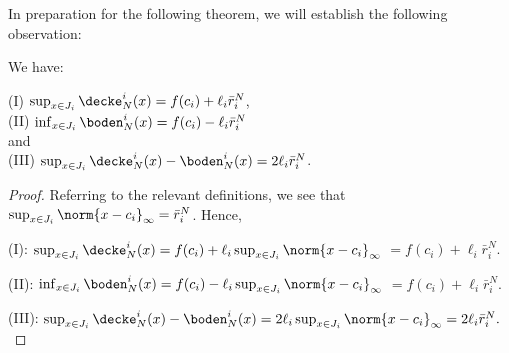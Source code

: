 In preparation for the following theorem, we will establish the following observation:
\begin{lem} \label{lem:supinfonJimultidim}
We have:

(I) $\sup_{x \in J_i} \decke_N^i (x) = f(c_i) + \ell_i \bar r_i^N$,\\


(II) $\inf_{x \in J_i}  \boden^i_N(x) = f(c_i) - \ell_i \bar r_i^N$\\
 
and\\

(III)  $\sup_{x \in J_i} \decke_N^i (x) - \boden_N^i(x) = 2 \ell_i \bar r_i^N$.


\begin{proof}
Referring to the relevant definitions, we see that $\sup_{x \in J_i} \norm{x-c_i}_{\infty} = \bar r_i^N$.
Hence, 

(I): $\sup_{x \in J_i} \decke^i_N(x) = f(c_i) + \ell_i \sup_{x \in J_i} \norm{x-c_i}_{\infty}$
$= f(c_i) + \ell_i \bar r_i^N$.

(II): $\inf_{x \in J_i} \boden^i_N(x) = f(c_i) - \ell_i \sup_{x \in J_i} \norm{x-c_i}_{\infty}$
$= f(c_i) + \ell_i \bar r_i^N$.

(III): $\sup_{x \in J_i} \decke_N^i (x) - \boden_N^i(x) = 2 \ell_i \sup_{x \in J_i} \norm{x-c_i}_{\infty}  =  2 \ell_i \bar r_i^N. $
\end{proof} 
\end{lem}



